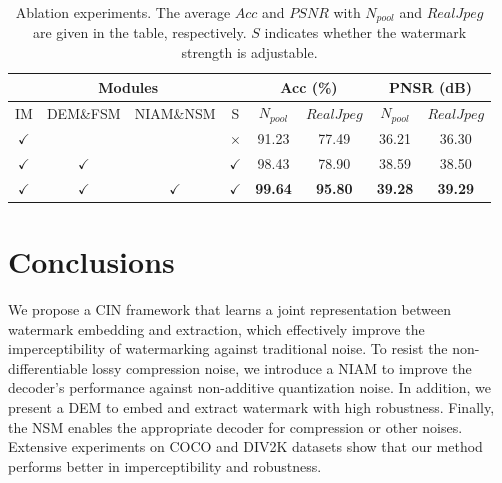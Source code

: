 \documentclass[sigconf]{acmart}
\begin{document}
\begin{table}[H]
	\centering
	\caption{Ablation experiments. The average $Acc$ and $PSNR$ with $N_{pool}$ and $RealJpeg$ are given in the table, respectively. $S$ indicates whether the watermark strength is adjustable.}
	\label{table: Ablation}
	
	\begin{tabular}{@{}cccc|cc|cc@{}}
		\toprule[1.5pt]
		\multicolumn{4}{c}{Modules} & \multicolumn{2}{c}{Acc (\%)} & \multicolumn{2}{c}{PNSR (dB)} \\ \midrule
		IM  & DEM\&FSM & NIAM\&NSM & S &$N_{pool}$       & $RealJpeg$  & $N_{pool}$        & $RealJpeg$       \\ \cmidrule(r){1-8}
		
		$\checkmark$ &          &        & $\times$ &     91.23        &  77.49          &       36.21      &      36.30      \\
		
		$\checkmark$ &   $\checkmark$       &  &      $\checkmark$  &   98.43        &78.90       &      38.59       &   38.50         \\
		
		
		$\checkmark$ &   $\checkmark$        &   $\checkmark$        &  $\checkmark$   &   \textbf{99.64}     &   \textbf{95.80}    &   \textbf{39.28}     &  \textbf{39.29}      \\
		
		\bottomrule[1.5pt]
	\end{tabular}
\end{table}





\section{Conclusions}

We propose a CIN framework that learns a joint representation between watermark embedding and extraction, which effectively improve the imperceptibility of watermarking against traditional noise. To resist the non-differentiable lossy compression noise, we introduce a NIAM to improve the decoder's performance against non-additive quantization noise. In addition, we present a DEM to embed and extract watermark with high robustness. Finally, the NSM enables the appropriate decoder for compression or other noises. Extensive experiments on COCO and DIV2K datasets show that our method performs better in imperceptibility and robustness.
 
\end{document}
